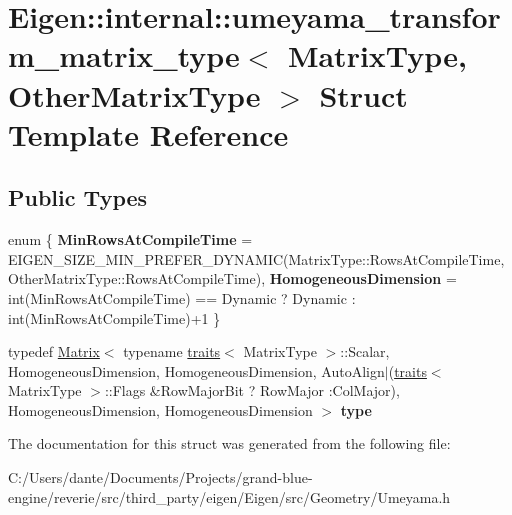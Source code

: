 \hypertarget{struct_eigen_1_1internal_1_1umeyama__transform__matrix__type}{}\section{Eigen\+::internal\+::umeyama\+\_\+transform\+\_\+matrix\+\_\+type$<$ Matrix\+Type, Other\+Matrix\+Type $>$ Struct Template Reference}
\label{struct_eigen_1_1internal_1_1umeyama__transform__matrix__type}
\subsection*{Public Types}
\begin{DoxyCompactItemize}
\item 
\mbox{\label{struct_eigen_1_1internal_1_1umeyama__transform__matrix__type_a02500f2ea60b421c05a0cc27c2e5b892}} 
enum \{ {\bfseries Min\+Rows\+At\+Compile\+Time} = E\+I\+G\+E\+N\+\_\+\+S\+I\+Z\+E\+\_\+\+M\+I\+N\+\_\+\+P\+R\+E\+F\+E\+R\+\_\+\+D\+Y\+N\+A\+M\+IC(Matrix\+Type\+::Rows\+At\+Compile\+Time, Other\+Matrix\+Type\+::Rows\+At\+Compile\+Time), 
{\bfseries Homogeneous\+Dimension} = int(Min\+Rows\+At\+Compile\+Time) == Dynamic ? Dynamic \+: int(Min\+Rows\+At\+Compile\+Time)+1
 \}
\item 
\mbox{\label{struct_eigen_1_1internal_1_1umeyama__transform__matrix__type_ac9515b0834bee3cf4a9ce0ed3adc9b2c}} 
typedef \mbox{\hyperlink{class_eigen_1_1_matrix}{Matrix}}$<$ typename \mbox{\hyperlink{struct_eigen_1_1internal_1_1traits}{traits}}$<$ Matrix\+Type $>$\+::Scalar, Homogeneous\+Dimension, Homogeneous\+Dimension, Auto\+Align$\vert$(\mbox{\hyperlink{struct_eigen_1_1internal_1_1traits}{traits}}$<$ Matrix\+Type $>$\+::Flags \&Row\+Major\+Bit ? Row\+Major \+:Col\+Major), Homogeneous\+Dimension, Homogeneous\+Dimension $>$ {\bfseries type}
\end{DoxyCompactItemize}


The documentation for this struct was generated from the following file\+:\begin{DoxyCompactItemize}
\item 
C\+:/\+Users/dante/\+Documents/\+Projects/grand-\/blue-\/engine/reverie/src/third\+\_\+party/eigen/\+Eigen/src/\+Geometry/Umeyama.\+h\end{DoxyCompactItemize}
